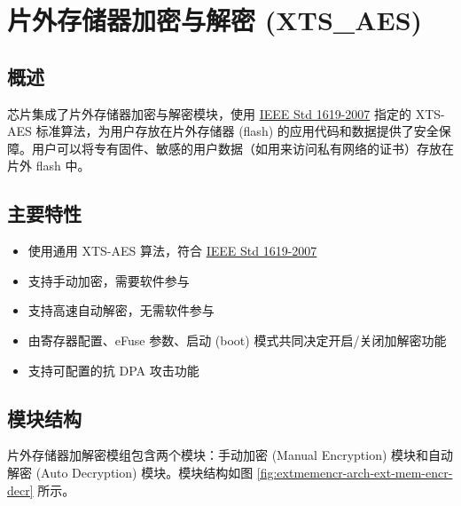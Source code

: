 \documentclass[main\_\_CN.tex]{subfiles}
\begin{document}

\ifglobal
\else
    {\let\clearpage\relax \listoftodos}
    {\let\clearpage\relax \listofdonetodos}
    \tableofcontents
\fi



\hypertarget{extmemencr}{}
\chapter{片外存储器加密与解密 (XTS\_AES)}
\label{mod:extmemencr}


\section{概述}

\chipname{} 芯片集成了片外存储器加密与解密模块，使用 \href{https://ieeexplore.ieee.org/document/4493450}{IEEE Std 1619-2007} 指定的 XTS-AES 标准算法，为用户存放在片外存储器 (flash) 的应用代码和数据提供了安全保障。用户可以将专有固件、敏感的用户数据（如用来访问私有网络的证书）存放在片外 flash 中。

\section{主要特性}

\begin{itemize}
    \item 使用通用 XTS-AES 算法，符合 \href{https://ieeexplore.ieee.org/document/4493450}{IEEE Std 1619-2007}
    \item 支持手动加密，需要软件参与
    \item 支持高速自动解密，无需软件参与
    \item 由寄存器配置、eFuse 参数、启动 (boot) 模式共同决定开启/关闭加解密功能
    \item 支持可配置的抗 DPA 攻击功能
\end{itemize}


\section{模块结构}
片外存储器加解密模组包含两个模块：手动加密 (Manual Encryption) 模块和自动解密 (Auto Decryption) 模块。模块结构如图 \ref{fig:extmemencr-arch-ext-mem-encr-decr} 所示。
\end{document}
